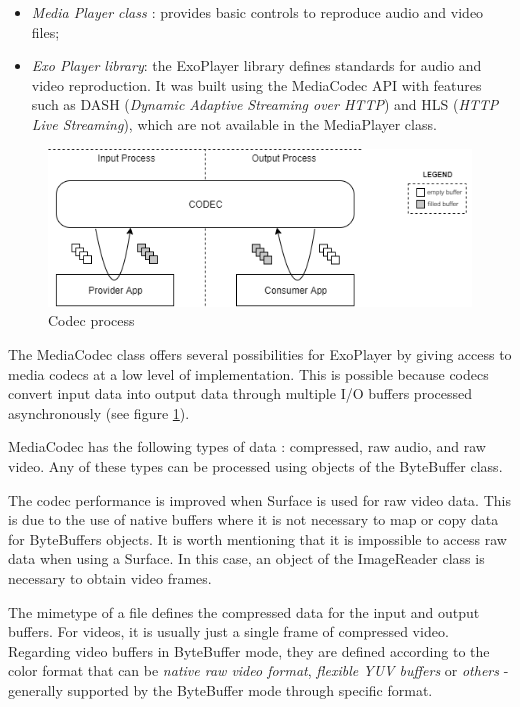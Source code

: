 \documentclass[runningheads]{llncs}
\begin{document}
\begin{itemize}
    \item \textit{Media Player class \cite{MediaPlayer}}: provides basic controls to reproduce audio and video files;
    \item \textit{Exo Player library}: the ExoPlayer \cite{Exo}\cite{ExoPlayerHello} library defines standards for audio and video reproduction.
 It was built using the MediaCodec API with features such as DASH
 (\textit{Dynamic Adaptive Streaming over HTTP}) and HLS (\textit{HTTP Live Streaming}), which are not available in the MediaPlayer class.
\end{itemize}

\begin{figure}[h!]
    \centerline{\includegraphics[scale=0.5]{images/codec.png}}
    \caption{Codec process}
    \label{fig-codec}
\end{figure}

The MediaCodec class offers several possibilities for ExoPlayer by giving access to media codecs at a
low level of implementation. This is possible because codecs convert input data
into output data through multiple I/O buffers processed asynchronously (see figure \ref{fig-codec}).

MediaCodec has the following types of data \cite{MediaCodec}: compressed, raw audio, and raw video. Any of these types can be processed using objects of the ByteBuffer class.

The codec performance is improved when Surface is used for raw video data. This is due to the use of native buffers where it is not necessary to map or copy data for ByteBuffers objects. It is worth mentioning that it is impossible to access raw data when using a Surface. In this case, an object of the ImageReader class is necessary to obtain video frames.

The mimetype of a file defines the compressed data for the input and output buffers. For videos, it is usually just a single frame of compressed video. Regarding video buffers in ByteBuffer mode, they are defined according to the color format that can be \textit{native raw video format}, \textit{flexible YUV buffers} or \textit{others} - generally supported by the ByteBuffer mode through specific format.
\end{document}
